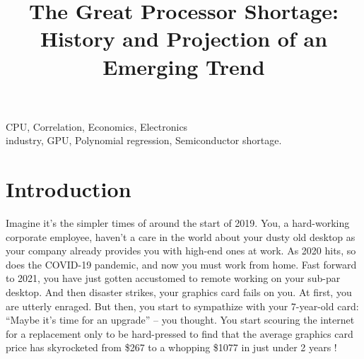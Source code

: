 \documentclass[conference]{IEEEtran}
\begin{document}
\title{
	The Great Processor Shortage:\\
	History and Projection of an Emerging Trend
}

\author{
	\and
	\and
	\and
}

\maketitle

\begin{abstract}
\end{abstract}

\begin{IEEEkeywords}
	CPU, Correlation, Economics, Electronics\\
	industry, GPU, Polynomial regression, Semiconductor shortage.
\end{IEEEkeywords}

\section{Introduction}
Imagine it's the simpler times of around the start of 2019. You, a
hard-working corporate employee, haven't a care in the world about your
dusty old desktop as your company already provides you with high-end ones
at work. As 2020 hits, so does the COVID-19 pandemic, and now you must
work from home. Fast forward to 2021, you have just gotten accustomed to
remote working on your sub-par desktop. And then disaster strikes, your
graphics card fails on you. At first, you are utterly enraged. But then,
you start to sympathize with your 7-year-old card: ``Maybe it's time for
an upgrade'' -- you thought. You start scouring the internet for a
replacement only to be hard-pressed to find that the average graphics
card price has skyrocketed from \$267 to a whopping \$1077 in just under 2
years \cite{Dave:2022}!
\end{document}
